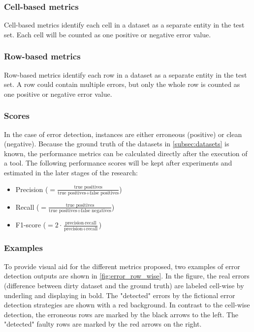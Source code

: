 \subsubsection{Cell-based metrics}
Cell-based metrics identify each cell in a dataset as a separate entity in the test set. Each cell will be counted as one positive or negative error value.

\subsubsection{Row-based metrics}
Row-based metrics identify each row in a dataset as a separate entity in the test set. A row could contain multiple errors, but only the whole row is counted as one positive or negative error value.

\subsubsection{Scores}
In the case of error detection, instances are either erroneous (positive) or clean (negative). Because the ground truth of the datasets in \autoref{subsec:datasets} is known, the performance metrics can be calculated directly after the execution of a tool. 
The following performance scores will be kept after experiments and estimated in the later stages of the research:
\begin{itemize}
    \item Precision ($= \frac{\text{true positives}}{\text{true positives} + \text{false positives}}$)
    \item Recall ($= \frac{\text{true positives}}{\text{true positives} + \text{false negatives}}$)
    \item F1-score ($= 2 \cdot \frac{\text{precision} \cdot \text{recall}}{\text{precision} + \text{recall}}$)
\end{itemize}

\subsubsection{Examples}
To provide visual aid for the different metrics proposed, two examples of error detection outputs are shown in \autoref{fig:error_row_wise}. In the figure, the real errors (difference between dirty dataset and the ground truth) are labeled cell-wise by underling and displaying in bold. The "detected" errors by the fictional error detection strategies are shown with a red background. In contrast to the cell-wise detection, the erroneous rows are marked by the black arrows to the left. The "detected" faulty rows are marked by the red arrows on the right.

